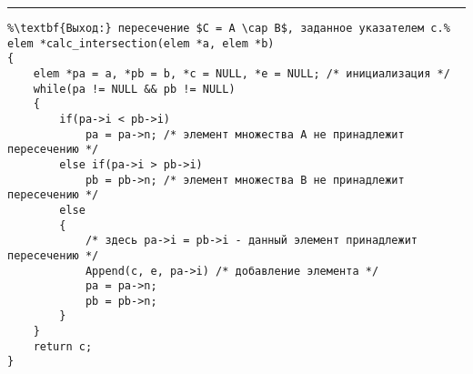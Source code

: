 \vspace{5pt} \hrule
\begin{lstlisting}[caption={Вычисление пересечения слиянием}, label=p_45, escapechar=\%]
%\noindent\textbf{Вход:} пересекаемые множества A и B, заданные указателями a и b.\\%
%\textbf{Выход:} пересечение $C = A \cap B$, заданное указателем c.%
elem *calc_intersection(elem *a, elem *b)
{
	elem *pa = a, *pb = b, *c = NULL, *e = NULL; /* инициализация */
	while(pa != NULL && pb != NULL)
	{
		if(pa->i < pb->i)
			pa = pa->n; /* элемент множества A не принадлежит пересечению */
		else if(pa->i > pb->i)
			pb = pb->n; /* элемент множества B не принадлежит пересечению */
		else
		{
			/* здесь pa->i = pb->i - данный элемент принадлежит пересечению */
			Append(c, e, pa->i) /* добавление элемента */
			pa = pa->n;
			pb = pb->n;
		}
	}
	return c;
}
\end{lstlisting}

